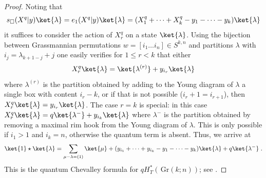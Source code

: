 \documentclass[12pt]{amsart}
\newcommand{\Gr}{\,\mathrm{Gr}}
\numberwithin{equation}{section}
\numberwithin{figure}{section}
\begin{document}
\begin{proof}
    Noting that
    \[
    s_\Box(X^q|y)\ket{\lambda}=e_1(X^q|y)\ket{\lambda}=(X_1^q+\cdots+X_k^q-y_1-\cdots-y_k)\ket{\lambda}
    \]
    it suffices to consider the action of $X_r^q$ on a state $\ket{\lambda}$. Using the bijection between Grassmannian permutations $w=[i_1\ldots i_n]\in S^{k,n}$ and partitions $\lambda$ with $i_j=\lambda_{k+1-j}+j$ one easily verifies for $1\le r<k$ that either $$X_r^q\ket{\lambda}=\ket{\lambda^{(r)}}+y_{i_r}\ket{\lambda}$$
    where $\lambda^{(r)}$ is the partition obtained by adding to the Young diagram of $\lambda$ a single box with content $i_r-k$, or if that is not possible ($i_r+1=i_{r+1}$), then $X_r^q\ket{\lambda}=y_{i_r}\ket{\lambda}$. The case $r=k$ is special: in this case $X_r^q\ket{\lambda}=q\ket{\lambda^{-}}+y_{i_k}\ket{\lambda}$ where $\lambda^{-}$ is the partition obtained by removing a maximal rim hook from the Young diagram of $\lambda$. This is only possible if $i_1>1$ and $i_k=n$, otherwise the quantum term is absent. Thus, we arrive at
    \[
    \ket{1}\star\ket{\lambda}=\sum_{\mu-\lambda=(1)}\ket{\mu}+(y_{i_1}+\cdots+y_{i_k}-y_1-\cdots-y_k)\ket{\lambda}
    +q\ket{\lambda^-}\;.
    \] 
    This is the quantum Chevalley formula for $qH^*_T(\Gr(k;n))$; see \cite[Thm 1]{MihalceaAIM}.
\end{proof}

\end{document}
